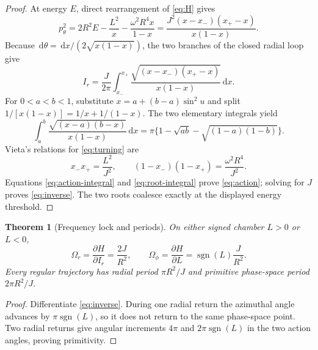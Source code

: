 \documentclass[10pt]{article}
\newcommand{\sgn}{\operatorname{sgn}}
\newcommand{\dd}{\,\mathrm d}
\newtheorem{theorem}{Theorem}
\begin{document}
\begin{proof}
At energy $E$, direct rearrangement of \eqref{eq:H} gives
\[
 p_\theta^2
 =2R^2E-\frac{L^2}{x}-\frac{\omega^2R^4x}{1-x}
 =\frac{J^2(x-x_-)(x_+-x)}{x(1-x)}.
\]
Because $\dd\theta=\dd x/(2\sqrt{x(1-x)})$, the two branches of the
closed radial loop give
\begin{equation}
 I_r=\frac{J}{2\pi}\int_{x_-}^{x_+}
 \frac{\sqrt{(x-x_-)(x_+-x)}}{x(1-x)}\dd x .
 \label{eq:action-integral}
\end{equation}
For $0<a<b<1$, substitute $x=a+(b-a)\sin^2u$ and split
$1/[x(1-x)]=1/x+1/(1-x)$.  The two elementary integrals yield
\begin{equation}
 \int_a^b\frac{\sqrt{(x-a)(b-x)}}{x(1-x)}\dd x
 =\pi\{1-\sqrt{ab}-\sqrt{(1-a)(1-b)}\}.            \label{eq:root-integral}
\end{equation}
Vieta's relations for \eqref{eq:turning} are
\[
 x_-x_+=\frac{L^2}{J^2},\qquad
 (1-x_-)(1-x_+)=\frac{\omega^2R^4}{J^2}.
\]
Equations \eqref{eq:action-integral} and \eqref{eq:root-integral} prove
\eqref{eq:action}; solving for $J$ proves \eqref{eq:inverse}.  The two roots
coalesce exactly at the displayed energy threshold.
\end{proof}

\begin{theorem}[Frequency lock and periods]
On either signed chamber $L>0$ or $L<0$,
\[
 \Omega_r=\frac{\partial H}{\partial I_r}=\frac{2J}{R^2},
 \qquad
 \Omega_\phi=\frac{\partial H}{\partial L}
 =\sgn(L)\frac{J}{R^2}.
\]
Every regular trajectory has radial period $\pi R^2/J$ and primitive
phase-space period $2\pi R^2/J$.
\end{theorem}

\begin{proof}
Differentiate \eqref{eq:inverse}.  During one radial return the azimuthal
angle advances by $\pi\sgn(L)$, so it does not return to the same phase-space
point.  Two radial returns give angular increments $4\pi$ and
$2\pi\sgn(L)$ in the two action angles, proving primitivity.
\end{proof}
\end{document}
